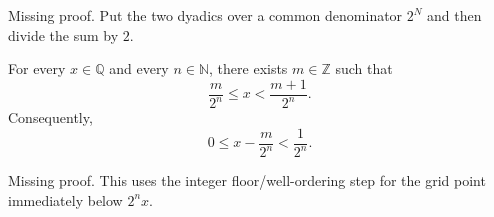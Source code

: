 \begin{remark*}[Status]
Missing proof. Put the two dyadics over a common denominator $2^N$ and then divide the sum by $2$.
\end{remark*}

\begin{tcolorbox}[colback=thmbox, colframe=thmborder, arc=2pt,
  left=6pt, right=6pt, top=4pt, bottom=4pt,
  title={\small\textbf{Theorem (Dyadic Approximation Error Bound)}},
  fonttitle=\small\bfseries]
\begin{theorem}
\label{thm:dyadic-approximation-error-bound}
For every $x\in\mathbb{Q}$ and every $n\in\mathbb{N}$, there exists $m\in\mathbb{Z}$ such that
\[
\frac{m}{2^n}\le x<\frac{m+1}{2^n}.
\]
Consequently,
\[
0\le x-\frac{m}{2^n}<\frac{1}{2^n}.
\]
\end{theorem}
\end{tcolorbox}

\begin{remark*}[Status]
Missing proof. This uses the integer floor/well-ordering step for the grid point immediately below $2^n x$.
\end{remark*}
